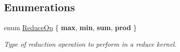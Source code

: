 \subsection*{Enumerations}
\begin{DoxyCompactItemize}
\item 
\mbox{\label{namespacewash_a9c59e8c142d63d8640921c1b1957807e}} 
enum \mbox{\hyperlink{namespacewash_a9c59e8c142d63d8640921c1b1957807e}{Reduce\+Op}} \{ {\bfseries max}, 
{\bfseries min}, 
{\bfseries sum}, 
{\bfseries prod}
 \}
\begin{DoxyCompactList}\small\item\em Type of reduction operation to perform in a reduce kernel. \end{DoxyCompactList}\end{DoxyCompactItemize}
